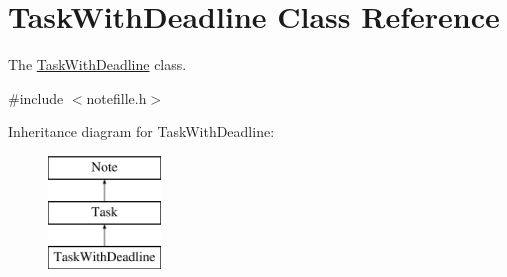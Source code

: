 \hypertarget{classTaskWithDeadline}{}\section{Task\+With\+Deadline Class Reference}
\label{classTaskWithDeadline}


The \hyperlink{classTaskWithDeadline}{Task\+With\+Deadline} class.  




{\ttfamily \#include $<$notefille.\+h$>$}

Inheritance diagram for Task\+With\+Deadline\+:\begin{figure}[H]
\begin{center}
\leavevmode
\includegraphics[height=3.000000cm]{classTaskWithDeadline}
\end{center}
\end{figure}
